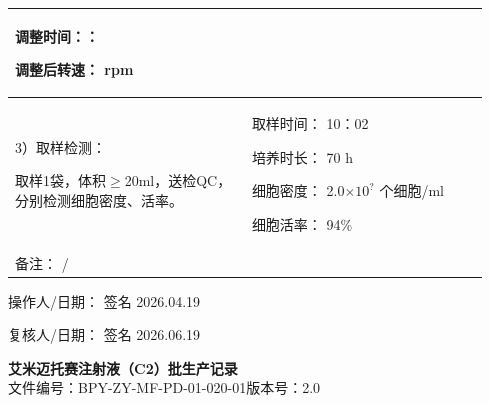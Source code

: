 \documentclass[UTF8,10pt,a4paper,fontset=fandol]{ctexart}
\newcommand{\fieldvalue}[1]{#1}
\newcommand{\handwritten}[1]{#1}
\begin{document}
\begin{tabular}{|p{0.47\linewidth}|p{0.47\linewidth}|}
\begin{minipage}[t]{0.45\linewidth}
调整时间：\underline{\hspace{1.5cm}}：\underline{\hspace{1.5cm}}

调整后转速：\underline{\hspace{1.5cm}} rpm
\end{minipage}
\\
\hline
\begin{minipage}[t]{0.45\linewidth}
3）取样检测：

取样1袋，体积$\geq$20ml，送检QC，分别检测细胞密度、活率。
\end{minipage}
&
\begin{minipage}[t]{0.45\linewidth}
取样时间：
\fieldvalue{\handwritten{10：02}}

培养时长：
\fieldvalue{\handwritten{70}} h

细胞密度：
\fieldvalue{\handwritten{2.0$\times 10^{?}$}} 个细胞/ml

细胞活率：
\fieldvalue{\handwritten{94}}\%
\end{minipage}
\\
\hline
\multicolumn{2}{|l|}{备注：
\fieldvalue{\handwritten{/}}}
\\
\hline
\end{tabular}

\vspace{0.4em}

\noindent
操作人/日期：
\fieldvalue{\handwritten{签名}}
\quad
\fieldvalue{\handwritten{2026.04.19}}

\hfill
复核人/日期：
\fieldvalue{\handwritten{签名}}
\quad
\fieldvalue{\handwritten{2026.06.19}}

\newpage

\begin{center}
\textbf{艾米迈托赛注射液（C2）批生产记录}\\
文件编号：BPY-ZY-MF-PD-01-020-01\qquad 版本号：2.0
\end{center}
\end{document}
